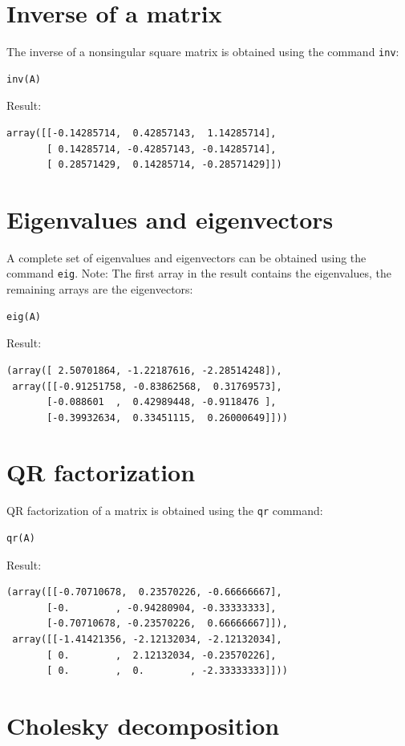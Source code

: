 \documentclass{article}
\begin{document}
\section{Inverse of a matrix}

The inverse of a nonsingular square matrix is obtained using the command {\tt inv}:
\begin{verbatim}
inv(A)
\end{verbatim}
Result:
\begin{verbatim}
array([[-0.14285714,  0.42857143,  1.14285714],
       [ 0.14285714, -0.42857143, -0.14285714],
       [ 0.28571429,  0.14285714, -0.28571429]])
\end{verbatim}

\section{Eigenvalues and eigenvectors}

A complete set of eigenvalues and eigenvectors can be obtained using the command {\tt eig}.
Note: The first array in the result contains the eigenvalues, the remaining arrays are the
eigenvectors:
\begin{verbatim}
eig(A)
\end{verbatim}
Result:
\begin{verbatim}
(array([ 2.50701864, -1.22187616, -2.28514248]), 
 array([[-0.91251758, -0.83862568,  0.31769573],
       [-0.088601  ,  0.42989448, -0.9118476 ],
       [-0.39932634,  0.33451115,  0.26000649]]))
\end{verbatim}

\section{QR factorization}

QR factorization of a matrix is obtained using the {\tt qr} command:
\begin{verbatim}
qr(A)
\end{verbatim}
Result:
\begin{verbatim}
(array([[-0.70710678,  0.23570226, -0.66666667],
       [-0.        , -0.94280904, -0.33333333],
       [-0.70710678, -0.23570226,  0.66666667]]), 
 array([[-1.41421356, -2.12132034, -2.12132034],
       [ 0.        ,  2.12132034, -0.23570226],
       [ 0.        ,  0.        , -2.33333333]]))
\end{verbatim}

\section{Cholesky decomposition}
\end{document}
